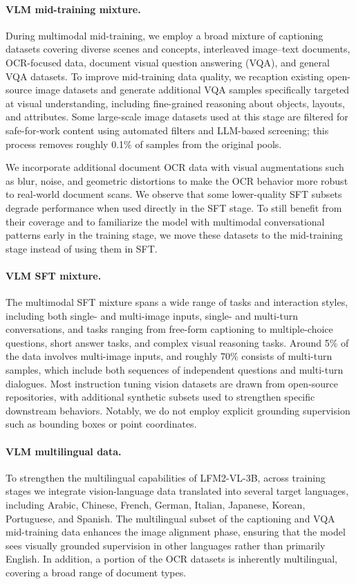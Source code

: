 \documentclass{article}
\begin{document}
\paragraph{VLM mid-training mixture.}
During multimodal mid-training, we employ a broad mixture of captioning datasets covering diverse scenes and concepts, interleaved image–text documents, OCR-focused data, document visual question answering (VQA), and general VQA datasets. To improve mid-training data quality, we recaption existing open-source image datasets and generate additional VQA samples specifically targeted at visual understanding, including fine-grained reasoning about objects, layouts, and attributes. Some large-scale image datasets used at this stage are filtered for safe-for-work content using automated filters and LLM-based screening; this process removes roughly 0.1\% of samples from the original pools.

We incorporate additional document OCR data with visual augmentations such as blur, noise, and geometric distortions to make the OCR behavior more robust to real-world document scans. We observe that some lower-quality SFT subsets degrade performance when used directly in the SFT stage. To still benefit from their coverage and to familiarize the model with multimodal conversational patterns early in the training stage, we move these datasets to the mid-training stage instead of using them in SFT.

\paragraph{VLM SFT mixture.}
The multimodal SFT mixture spans a wide range of tasks and interaction styles, including both single- and multi-image inputs, single- and multi-turn conversations, and tasks ranging from free-form captioning to multiple-choice questions, short answer tasks, and complex visual reasoning tasks. Around 5\% of the data involves multi-image inputs, and roughly 70\% consists of multi-turn samples, which include both sequences of independent questions and multi-turn dialogues. Most instruction tuning vision datasets are drawn from open-source repositories, with additional synthetic subsets used to strengthen specific downstream behaviors. Notably, we do not employ explicit grounding supervision such as bounding boxes or point coordinates.

\paragraph{VLM multilingual data.}
To strengthen the multilingual capabilities of LFM2-VL-3B, across training stages we integrate vision-language data translated into several target languages, including Arabic, Chinese, French, German, Italian, Japanese, Korean, Portuguese, and Spanish.
The multilingual subset of the captioning and VQA mid-training data enhances the image alignment phase, ensuring that the model sees visually grounded supervision in other languages rather than primarily English. In addition, a portion of the OCR datasets is inherently multilingual, covering a broad range of document types.
\end{document}
